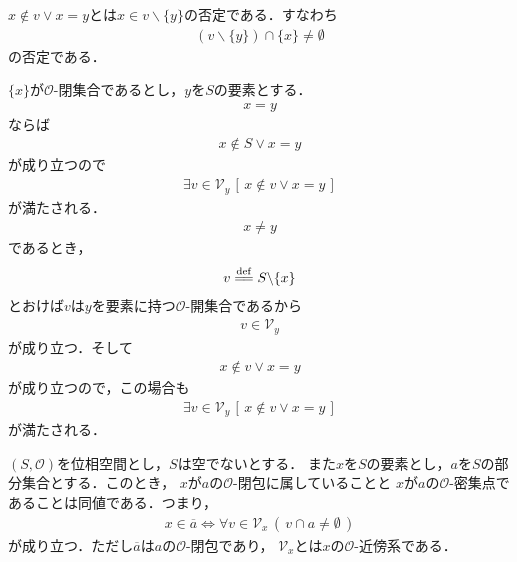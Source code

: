 	$x \notin v \vee x = y$とは$x \in v \backslash \{y\}$の否定である．すなわち
	\begin{align}
		(v \backslash \{y\}) \cap \{x\} \neq \emptyset
	\end{align}
	の否定である．
	
	\begin{sketch}
		$\{x\}$が$\mathscr{O}$-閉集合であるとし，$y$を$S$の要素とする．
		\begin{align}
			x = y
		\end{align}
		ならば
		\begin{align}
			x \notin S \vee x = y
		\end{align}
		が成り立つので
		\begin{align}
			\exists v \in \mathcal{V}_{y}\, \left[\, x \notin v \vee x = y\, \right]
		\end{align}
		が満たされる．
		\begin{align}
			x \neq y
		\end{align}
		であるとき，
		\begin{align}
			v \defeq S \backslash \{x\}
		\end{align}
		とおけば$v$は$y$を要素に持つ$\mathscr{O}$-開集合であるから
		\begin{align}
			v \in \mathcal{V}_{y}
		\end{align}
		が成り立つ．そして
		\begin{align}
			x \notin v \vee x = y
		\end{align}
		が成り立つので，この場合も
		\begin{align}
			\exists v \in \mathcal{V}_{y}\, \left[\, x \notin v \vee x = y\, \right]
		\end{align}
		が満たされる．
		\QED
	\end{sketch}
	
	\begin{screen}
		\begin{thm}[閉集合は密集点集合]
		\label{thm:belongs_to_closure_iff_clusters}
			$(S,\mathscr{O})$を位相空間とし，$S$は空でないとする．
			また$x$を$S$の要素とし，$a$を$S$の部分集合とする．このとき，
			$x$が$a$の$\mathscr{O}$-閉包に属していることと
			$x$が$a$の$\mathscr{O}$-密集点であることは同値である．つまり，
			\begin{align}
				x \in \overline{a} \Longleftrightarrow
				\forall v \in \mathcal{V}_{x}\, (\, v \cap a \neq \emptyset\, )
			\end{align}
			が成り立つ．ただし$\overline{a}$は$a$の$\mathscr{O}$-閉包であり，
			$\mathcal{V}_{x}$とは$x$の$\mathscr{O}$-近傍系である．
		\end{thm}
	\end{screen}
	
